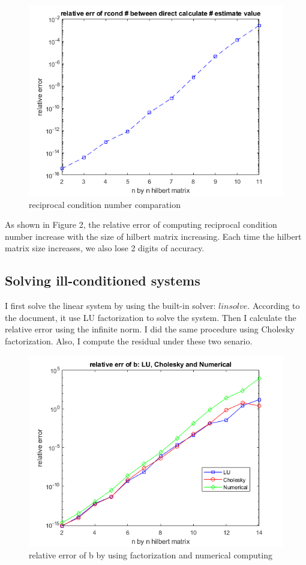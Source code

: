 \documentclass[a4paper]{article}
\begin{document}
\begin{figure}[H] 
\centering 
\includegraphics[width=1.0\textwidth]{1.1-2.png}
\caption{reciprocal condition number comparation} 
\label{Fig.1.1-2} 
\end{figure}

As shown in Figure 2, the relative error of computing reciprocal condition number increase with the size of hilbert
matrix increasing. Each time the hilbert matrix size increases, we also lose 2 digits of accuracy.

\subsection{Solving ill-conditioned systems}
I first solve the linear system by using the built-in solver: $linsolve$. According to the document, it use LU factorization 
to solve the system. Then I calculate the relative error using the infinite norm. I did the same procedure using Cholesky 
factorization. Also, I compute the residual under these two senario.

\begin{figure}[H] 
\centering 
\includegraphics[width=1.0\textwidth]{1.2-1.png}
\caption{relative error of b by using factorization and numerical computing} 
\label{Fig.1.2-1} 
\end{figure}
\end{document}
